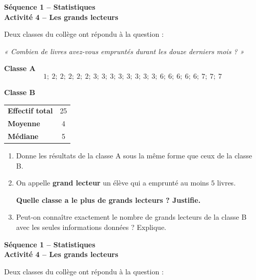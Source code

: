 \documentclass[12pt,a4paper]{article}
\newcommand{\blocdonnees}[1]{%
  \begin{tcolorbox}[mathsbox,colback=NeutreBg,colframe=NeutreC!45,boxrule=0.6pt,arc=2mm]
  #1
  \end{tcolorbox}
}
\begin{document}
\begin{center}
  {\sffamily\LARGE\bfseries\color{TitreC}Séquence 1 -- Statistiques}\\[0.2em]
  {\sffamily\large\bfseries\color{SavoirC}Activité 4 -- Les grands lecteurs}
\end{center}

Deux classes du collège ont répondu à la question :

\begin{center}
\textit{« Combien de livres avez-vous empruntés durant les douze derniers mois ? »}
\end{center}

\blocdonnees{
\textbf{Classe A}
\[
1;\ 2;\ 2;\ 2;\ 2;\ 2;\ 3;\ 3;\ 3;\ 3;\ 3;\ 3;\ 3;\ 3;\ 6;\ 6;\ 6;\ 6;\ 6;\ 7;\ 7;\ 7
\]

\medskip
\textbf{Classe B}

\begin{center}
\begin{tabular}{>{\bfseries}l c}
Effectif total & 25\\
Moyenne & 4\\
Médiane & 5
\end{tabular}
\end{center}
}

\begin{enumerate}
  \item Donne les résultats de la classe A sous la même forme que ceux de la classe B.

  \item On appelle \textbf{grand lecteur} un élève qui a emprunté au moins \(5\) livres.

  \textbf{Quelle classe a le plus de grands lecteurs ? Justifie.}

  \item Peut-on connaître exactement le nombre de grands lecteurs de la classe B avec les seules informations données ? Explique.
\end{enumerate}

\vspace{0.5cm}

\begin{center}
  {\sffamily\LARGE\bfseries\color{TitreC}Séquence 1 -- Statistiques}\\[0.2em]
  {\sffamily\large\bfseries\color{SavoirC}Activité 4 -- Les grands lecteurs}
\end{center}

Deux classes du collège ont répondu à la question :
\end{document}
